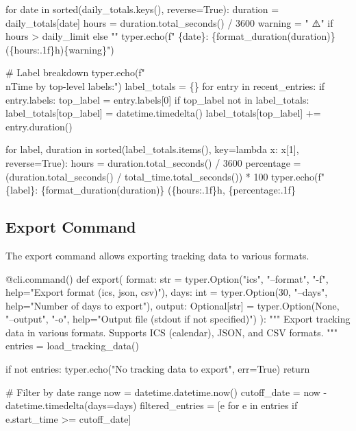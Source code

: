     for date in sorted(daily_totals.keys(), reverse=True):
        duration = daily_totals[date]
        hours = duration.total_seconds() / 3600
        warning = " ⚠️" if hours > daily_limit else ""
        typer.echo(f"  \{date\}: \{format_duration(duration)\} (\{hours:.1f\}h)\{warning\}")
    
    # Label breakdown
    typer.echo(f"\\nTime by top-level labels:")
    label_totals = \{\}
    for entry in recent_entries:
        if entry.labels:
            top_label = entry.labels[0]
            if top_label not in label_totals:
                label_totals[top_label] = datetime.timedelta()
            label_totals[top_label] += entry.duration()
    
    for label, duration in sorted(label_totals.items(), key=lambda x: x[1], reverse=True):
        hours = duration.total_seconds() / 3600
        percentage = (duration.total_seconds() / total_time.total_seconds()) * 100
        typer.echo(f"  \{label\}: \{format_duration(duration)\} (\{hours:.1f\}h, \{percentage:.1f\}%
\nwendcode{}\nwdocspar

\subsection{Export Command}

The export command allows exporting tracking data to various formats.

\nwenddocs{}\endmoddef\nwstartdeflinemarkup{}\nwenddeflinemarkup
@cli.command()
def export(
    format: str = typer.Option("ics", "--format", "-f", help="Export format (ics, json, csv)"),
    days: int = typer.Option(30, "--days", help="Number of days to export"),
    output: Optional[str] = typer.Option(None, "--output", "-o", help="Output file (stdout if not specified)")
):
    """
    Export tracking data in various formats.
    Supports ICS (calendar), JSON, and CSV formats.
    """
    entries = load_tracking_data()
    
    if not entries:
        typer.echo("No tracking data to export", err=True)
        return
    
    # Filter by date range
    now = datetime.datetime.now()
    cutoff_date = now - datetime.timedelta(days=days)
    filtered_entries = [e for e in entries if e.start_time >= cutoff_date]
    
